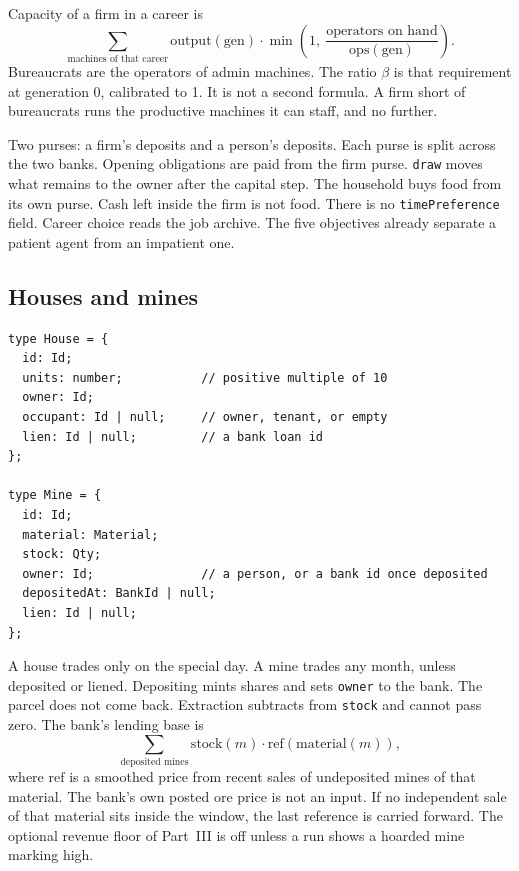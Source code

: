 \documentclass[11pt]{article}
\newenvironment{keep}{\noindent\begin{minipage}{\linewidth}}{\end{minipage}}
\begin{document}
Capacity of a firm in a career is
\[
\sum_{\text{machines of that career}}
  \mathrm{output}(\mathrm{gen})
  \cdot \min\!\left(1,\ 
    \frac{\text{operators on hand}}{\mathrm{ops}(\mathrm{gen})}\right).
\]
Bureaucrats are the operators of admin machines. The ratio $\beta$ is that
requirement at generation 0, calibrated to 1. It is not a second formula.
A firm short of bureaucrats runs the productive machines it can staff, and
no further.

Two purses: a firm's deposits and a person's deposits. Each purse is split
across the two banks. Opening obligations are paid from the firm purse.
\texttt{draw} moves what remains to the owner after the capital step.
The household buys food from its own purse. Cash left inside the firm is
not food. There is no \texttt{timePreference} field. Career choice reads
the job archive. The five objectives already separate a patient agent from
an impatient one.

\subsection{Houses and mines}

\begin{keep}
\begin{lstlisting}
type House = {
  id: Id;
  units: number;           // positive multiple of 10
  owner: Id;
  occupant: Id | null;     // owner, tenant, or empty
  lien: Id | null;         // a bank loan id
};

type Mine = {
  id: Id;
  material: Material;
  stock: Qty;
  owner: Id;               // a person, or a bank id once deposited
  depositedAt: BankId | null;
  lien: Id | null;
};
\end{lstlisting}
\end{keep}

A house trades only on the special day. A mine trades any month, unless
deposited or liened. Depositing mints shares and sets \texttt{owner} to the
bank. The parcel does not come back. Extraction subtracts from
\texttt{stock} and cannot pass zero. The bank's lending base is
\[
\sum_{\text{deposited mines}}
  \mathrm{stock}(m)\cdot \mathrm{ref}(\mathrm{material}(m)),
\]
where $\mathrm{ref}$ is a smoothed price from recent sales of undeposited
mines of that material. The bank's own posted ore price is not an input.
If no independent sale of that material sits inside the window, the last
reference is carried forward. The optional revenue floor of Part~III is off
unless a run shows a hoarded mine marking high.
\end{document}
